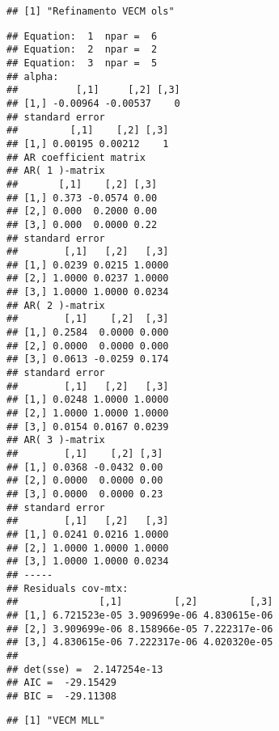 \documentclass[]{article}
\begin{document}
\begin{verbatim}
## [1] "Refinamento VECM ols"
\end{verbatim}

\begin{verbatim}
## Equation:  1  npar =  6 
## Equation:  2  npar =  2 
## Equation:  3  npar =  5 
## alpha:  
##          [,1]     [,2] [,3]
## [1,] -0.00964 -0.00537    0
## standard error 
##         [,1]    [,2] [,3]
## [1,] 0.00195 0.00212    1
## AR coefficient matrix 
## AR( 1 )-matrix 
##       [,1]    [,2] [,3]
## [1,] 0.373 -0.0574 0.00
## [2,] 0.000  0.2000 0.00
## [3,] 0.000  0.0000 0.22
## standard error 
##        [,1]   [,2]   [,3]
## [1,] 0.0239 0.0215 1.0000
## [2,] 1.0000 0.0237 1.0000
## [3,] 1.0000 1.0000 0.0234
## AR( 2 )-matrix 
##        [,1]    [,2]  [,3]
## [1,] 0.2584  0.0000 0.000
## [2,] 0.0000  0.0000 0.000
## [3,] 0.0613 -0.0259 0.174
## standard error 
##        [,1]   [,2]   [,3]
## [1,] 0.0248 1.0000 1.0000
## [2,] 1.0000 1.0000 1.0000
## [3,] 0.0154 0.0167 0.0239
## AR( 3 )-matrix 
##        [,1]    [,2] [,3]
## [1,] 0.0368 -0.0432 0.00
## [2,] 0.0000  0.0000 0.00
## [3,] 0.0000  0.0000 0.23
## standard error 
##        [,1]   [,2]   [,3]
## [1,] 0.0241 0.0216 1.0000
## [2,] 1.0000 1.0000 1.0000
## [3,] 1.0000 1.0000 0.0234
## ----- 
## Residuals cov-mtx: 
##              [,1]         [,2]         [,3]
## [1,] 6.721523e-05 3.909699e-06 4.830615e-06
## [2,] 3.909699e-06 8.158966e-05 7.222317e-06
## [3,] 4.830615e-06 7.222317e-06 4.020320e-05
##        
## det(sse) =  2.147254e-13 
## AIC =  -29.15429 
## BIC =  -29.11308
\end{verbatim}

\begin{verbatim}
## [1] "VECM MLL"
\end{verbatim}
\end{document}
